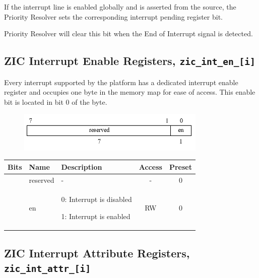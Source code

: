 If the interrupt line is enabled globally and is asserted from the source, the Priority Resolver sets the corresponding interrupt pending register bit.

Priority Resolver will clear this bit when the End of Interrupt signal is detected.

\subsection{ZIC Interrupt Enable Registers, \texttt{zic\_int\_en\_[i]}}
\label{subsec:zic-int-en}

Every interrupt supported by the platform has a dedicated interrupt enable register and occupies one byte in the memory map for ease of access. This enable bit is located in bit 0 of the byte.

\vspace{0.5cm}
\begin{figure}[H]
    \centering
    \includegraphics[width = 9cm]{images/zic_int_en.png}
    \label{fig:zic_int_en}
\end{figure}
\vspace{0.25cm}

\vspace{0.5cm}
\begin{table}[H]
    \label{tab:zic_int_en}
        \centering
        \begin{tabular}{l l p{8cm} c c}
         \hline 
         \textbf{Bits} & \textbf{Name} & \textbf{Description} & \textbf{Access} & \textbf{Preset}\\ \hline \hline
         [7:1] & reserved & - & - & 0 \\ \hline
         [0] & en & 0: Interrupt is disabled
         
         1: Interrupt is enabled & RW & 0\\ \hline
        \end{tabular}
\end{table}
\vspace{0.5cm}

\subsection{ZIC Interrupt Attribute Registers, \texttt{zic\_int\_attr\_[i]}}
\label{subsec:zic-int-attr}

